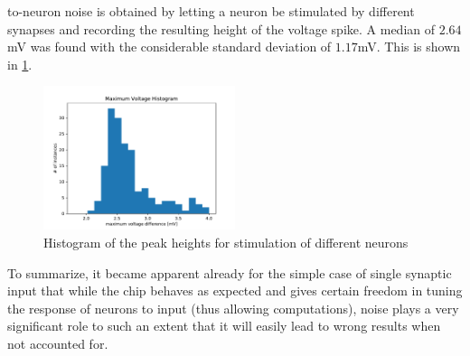 \documentclass[a4paper,twocolumn]{article}
\begin{document}
to-neuron noise is obtained by letting a neuron be stimulated by different synapses
and recording the resulting height of the voltage spike.  A median of $2.64$mV was
found with the considerable standard deviation of $1.17$mV.  This is shown in
\ref{MaxVoltHisto}.
\begin{figure}
		\includegraphics[width=0.5\textwidth]{figures/histo_maxVolt.pdf}
		\caption{Histogram of the peak heights for stimulation of different neurons}
		\label{MaxVoltHisto}
\end{figure}
To summarize,  it became apparent already for the simple case of single synaptic
input that while the chip behaves as expected and gives certain freedom in tuning
the response of neurons to input (thus allowing computations),  noise plays a very
significant role to such an extent that it will easily lead to wrong results when not
accounted for.
\end{document}
